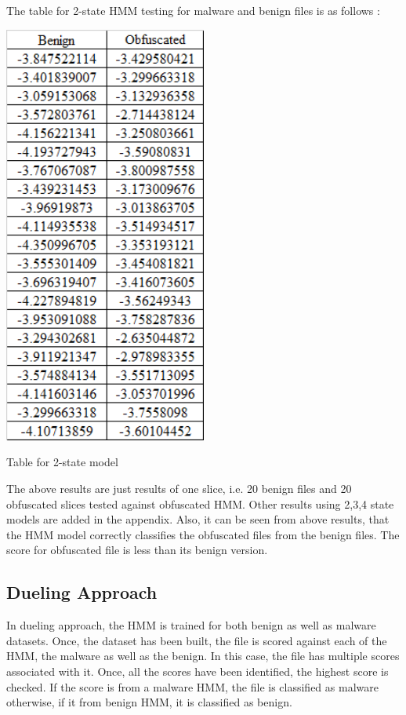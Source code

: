 The table for 2-state HMM testing for malware and benign files is as follows :
\begin{table}
\centering
\includegraphics[width=0.5\textwidth]{images/st2_m1.png}
\caption{Table for 2-state model} 
\label{table:Table for 2-state model}
\end{table}

The above results are just results of one slice, i.e. 20 benign files and 20 obfuscated slices tested against obfuscated HMM. Other results using 2,3,4 state models are added in the appendix. Also, it can be seen from above results, that the HMM model correctly classifies the obfuscated files from the benign files. The score for obfuscated file is less than its benign version.  

\subsection{Dueling Approach}
In dueling approach, the HMM is trained for both benign as well as malware datasets. Once, the dataset has been built, the file is scored against each of the HMM, the malware as well as the benign. In this case, the file has multiple scores associated with it. Once, all the scores have been identified, the highest score is checked. If the score is from a malware HMM, the file is classified as malware otherwise, if it from benign HMM, it is classified as benign. 

